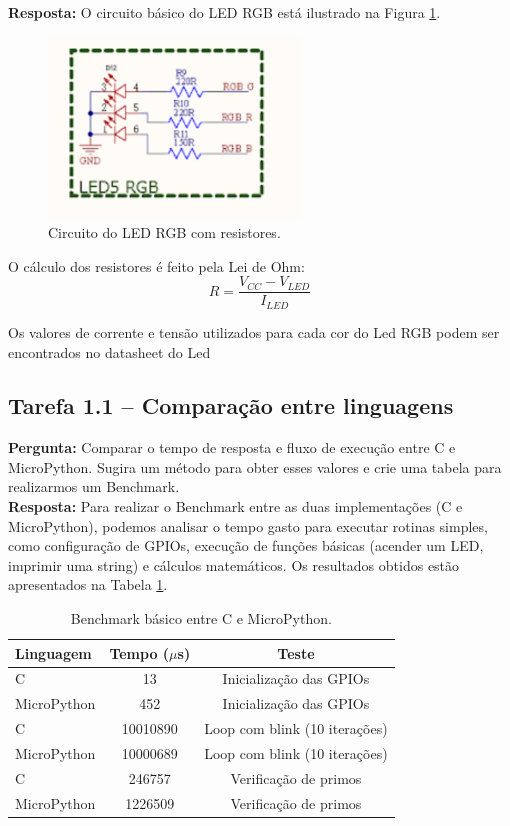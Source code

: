 \documentclass{article}
\begin{document}
\noindent
\textbf{Resposta:} O circuito básico do LED RGB está ilustrado na Figura \ref{fig:circuito_led}.  

\begin{figure}[H]
    \centering
    \includegraphics[width=0.6\textwidth]{circuito_led.png}
    \caption{Circuito do LED RGB com resistores.}
    \label{fig:circuito_led}
\end{figure}

O cálculo dos resistores é feito pela Lei de Ohm:  
\[
R = \frac{V_{CC} - V_{LED}}{I_{LED}}
\]

Os valores de corrente e tensão utilizados para cada cor do Led RGB podem ser encontrados no datasheet do Led

\subsection{Tarefa 1.1 -- Comparação entre linguagens}
\textbf{Pergunta:} Comparar o tempo de resposta e fluxo de execução entre C e MicroPython. Sugira um método para obter esses valores e crie uma tabela para realizarmos um Benchmark. \\

\noindent
\textbf{Resposta:}  
Para realizar o Benchmark entre as duas implementações (C e MicroPython), podemos analisar o tempo gasto para executar rotinas simples, como configuração de GPIOs, execução de funções básicas (acender um LED, imprimir uma string) e cálculos matemáticos. Os resultados obtidos estão apresentados na Tabela \ref{tab:benchmark}.  

\begin{table}[H]
    \centering
    \label{tab:benchmark}
    \begin{tabular}{lcc}
        \toprule
        Linguagem & Tempo ($\mu$s) & Teste \\
        \midrule
        C            & 13       & Inicialização das GPIOs \\
        MicroPython  & 452      & Inicialização das GPIOs \\
        C            & 10010890 & Loop com blink (10 iterações) \\
        MicroPython  & 10000689 & Loop com blink (10 iterações) \\
        C            & 246757   & Verificação de primos \\
        MicroPython  & 1226509  & Verificação de primos \\
        \bottomrule
    \end{tabular}
    \caption{Benchmark básico entre C e MicroPython.}
\end{table}
\end{document}
